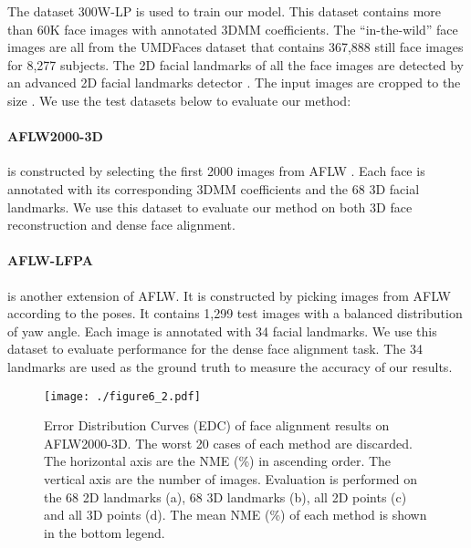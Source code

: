\documentclass[10pt,twocolumn,letterpaper]{article}
\begin{document}
{The dataset 300W-LP \cite{zhu2016face} is used to train our model. This dataset contains more than 60K face images with annotated 3DMM coefficients. The ``in-the-wild'' face images are all from the UMDFaces dataset \cite{bansal2017umdfaces} that  contains 367,888 still face images for 8,277 subjects. The 2D facial landmarks of all the face images are detected by an advanced 2D facial landmarks detector \cite{bulat2017far}. The input images are cropped to the size . We use the test datasets below to evaluate our method:
\vspace{-0.4cm}
\paragraph{AFLW2000-3D \cite{zhu2016face}} is constructed by selecting the first 2000 images from AFLW \cite{koestinger2011annotated}. Each face is annotated with its corresponding 3DMM coefficients and the 68 3D facial landmarks. We use this dataset to evaluate our method on both 3D face reconstruction and dense face alignment.
\vspace{-0.4cm}
\paragraph{AFLW-LFPA \cite{jeni2016first}} is another extension of AFLW. It is constructed by picking images from AFLW according to the poses. It contains 1,299 test images with a balanced distribution of yaw angle. Each image is annotated with 34 facial landmarks. We use this dataset to evaluate performance for the dense face alignment task. The 34 landmarks are used as the ground truth to measure the accuracy of our results.
\begin{figure*}[t]
\center
\hspace{0.2cm}
\texttt{[image: ./figure6\_2.pdf]}
\vspace{-0.3cm}
\caption{Error Distribution Curves (EDC) of face alignment results on AFLW2000-3D. The worst 20 cases of each method are discarded. The horizontal axis are the NME (\%) in ascending order. The vertical axis are the number of images. Evaluation is performed on the 68 2D landmarks (a), 68 3D landmarks (b), all 2D points (c) and all 3D points (d). The mean NME (\%) of each method is shown in the bottom legend.}
\label{fig:6}
\end{figure*}

\vspace{-0.0cm}
}
\end{document}
